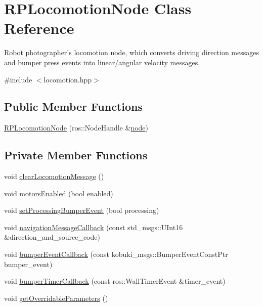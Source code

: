 \hypertarget{class_r_p_locomotion_node}{\section{\-R\-P\-Locomotion\-Node \-Class \-Reference}
\label{class_r_p_locomotion_node}
}


\-Robot photographer's locomotion node, which converts driving direction messages and bumper press events into linear/angular velocity messages.  




{\ttfamily \#include $<$locomotion.\-hpp$>$}

\subsection*{\-Public \-Member \-Functions}
\begin{DoxyCompactItemize}
\item 
\hyperlink{class_r_p_locomotion_node_aec52b5a922fa41093d3b976123324134}{\-R\-P\-Locomotion\-Node} (ros\-::\-Node\-Handle \&\hyperlink{class_r_p_locomotion_node_ad07de383fa61683b6dd9c38944e4d33b}{node})
\end{DoxyCompactItemize}
\subsection*{\-Private \-Member \-Functions}
\begin{DoxyCompactItemize}
\item 
void \hyperlink{class_r_p_locomotion_node_ae7b34004f4380cd69c005c880236e673}{clear\-Locomotion\-Message} ()
\item 
void \hyperlink{class_r_p_locomotion_node_a8dc03e77588c06484dbd5de534c0691a}{motors\-Enabled} (bool enabled)
\item 
void \hyperlink{class_r_p_locomotion_node_a7cae2e18baf2774457f81a6e103f8def}{set\-Processing\-Bumper\-Event} (bool processing)
\item 
void \hyperlink{class_r_p_locomotion_node_af2b3ece580cb48b4195709a33bbca9ef}{navigation\-Message\-Callback} (const std\-\_\-msgs\-::\-U\-Int16 \&direction\-\_\-and\-\_\-source\-\_\-code)
\item 
void \hyperlink{class_r_p_locomotion_node_ac82f2e8ea6dab4fa288293c0c51df671}{bumper\-Event\-Callback} (const kobuki\-\_\-msgs\-::\-Bumper\-Event\-Const\-Ptr bumper\-\_\-event)
\item 
void \hyperlink{class_r_p_locomotion_node_aca1892fd551a02799b4e60b8d82a0118}{bumper\-Timer\-Callback} (const ros\-::\-Wall\-Timer\-Event \&timer\-\_\-event)
\item 
void \hyperlink{class_r_p_locomotion_node_ac4ebecd8de7386c96aba8aebb15c3461}{get\-Overridable\-Parameters} ()
\end{DoxyCompactItemize}
